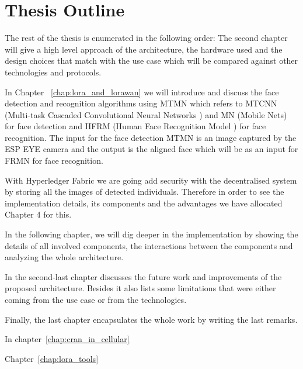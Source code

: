 \section{Thesis Outline}
The rest of the thesis is enumerated in the following order: The second chapter will give a high level approach of the architecture, the hardware used and the design choices that match with the use case which will be compared against other technologies and protocols.

In Chapter ~\ref{chap:lora_and_lorawan} we will introduce and discuss the face detection and recognition algorithms using MTMN which refers to MTCNN (Multi-task Cascaded Convolutional Neural Networks ) and MN (Mobile Nets) for face detection and HFRM (Human Face Recognition Model ) for face recognition. The input for the face detection MTMN is an image captured by the ESP EYE camera and the output is the aligned face which will be as an input for FRMN for face recognition. 

With Hyperledger Fabric we are going add security with the decentralised system by storing all the images of detected individuals. Therefore in order to see the implementation details, its components and the advantages we have allocated Chapter 4 for this. 

In the following chapter, we will dig deeper in the implementation by showing the details of all involved components, the interactions between the components and analyzing the whole architecture. 


In the second-last chapter discusses the future work and improvements of the proposed architecture. Besides  it also lists some limitations that were either coming from the use case or from the technologies. 

Finally, the last chapter encapsulates the whole work by writing the last remarks.

In chapter~\ref{chap:cran_in_cellular}

Chapter~\ref{chap:lora_tools} 


